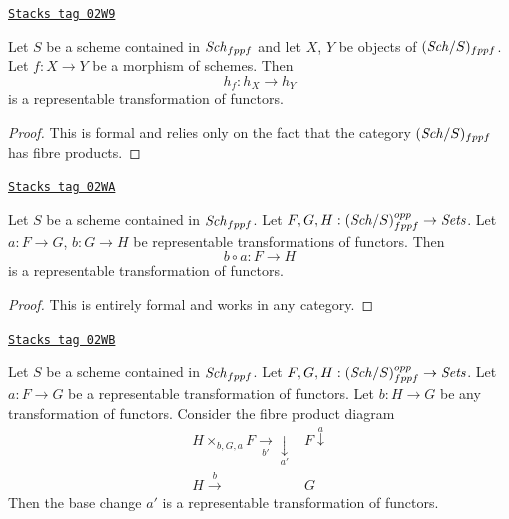 \begin{lemma}
\label{spaces-lemma-morphism-schemes-gives-representable-transformation}
\href{https://stacks.math.columbia.edu/tag/02W9}{\texttt{Stacks tag 02W9}}

Let $S$ be a scheme contained in $\mathit{Sch}_{fppf}$ and let
$X$, $Y$ be objects of $(\mathit{Sch}/S)_{fppf}$.
Let $f : X \to Y$ be a morphism of schemes.
Then
$$
h_f : h_X \longrightarrow h_Y
$$
is a representable transformation of functors.
\end{lemma}

\begin{proof}
This is formal and relies only on the fact that
the category $(\mathit{Sch}/S)_{fppf}$ has fibre products.
\end{proof}

\begin{lemma}
\label{spaces-lemma-composition-representable-transformations}
\href{https://stacks.math.columbia.edu/tag/02WA}{\texttt{Stacks tag 02WA}}

Let $S$ be a scheme contained in $\mathit{Sch}_{fppf}$.
Let $F, G, H : (\mathit{Sch}/S)_{fppf}^{opp} \to \textit{Sets}$.
Let $a : F \to G$, $b : G \to H$ be representable transformations of functors.
Then
$$
b \circ a : F \longrightarrow H
$$
is a representable transformation of functors.
\end{lemma}

\begin{proof}
This is entirely formal and works in any category.
\end{proof}

\begin{lemma}
\label{spaces-lemma-base-change-representable-transformations}
\href{https://stacks.math.columbia.edu/tag/02WB}{\texttt{Stacks tag 02WB}}

Let $S$ be a scheme contained in $\mathit{Sch}_{fppf}$.
Let $F, G, H : (\mathit{Sch}/S)_{fppf}^{opp} \to \textit{Sets}$.
Let $a : F \to G$ be a representable transformation of functors.
Let $b : H \to G$ be any transformation of functors.
Consider the fibre product diagram
$$
\begin{array}{cc}H \times_{b, G, a} F \underset{b'}{\longrightarrow}\underset{a'}{\downarrow} & F \overset{a}{\downarrow} \\ H \overset{b}{\longrightarrow} & G\end{array}
$$
Then the base change $a'$ is a representable transformation of functors.
\end{lemma}

